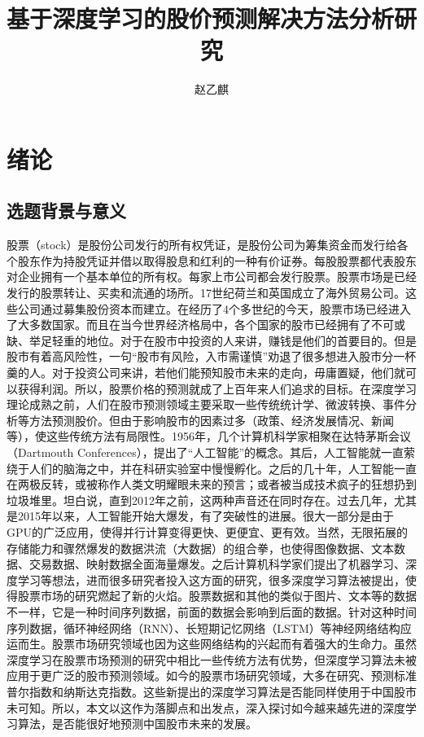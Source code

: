 \documentclass[UTF8]{ctexart}
\author{赵乙麒}
\title{基于深度学习的股价预测解决方法分析研究}
\begin{document}
\maketitle
\section{绪论}
\subsection{选题背景与意义}
股票（stock）是股份公司发行的所有权凭证，是股份公司为筹集资金而发行给各个股东作为持股凭证并借以取得股息和红利的一种有价证券。每股股票都代表股东对企业拥有一个基本单位的所有权。每家上市公司都会发行股票。股票市场是已经发行的股票转让、买卖和流通的场所。17世纪荷兰和英国成立了海外贸易公司。这些公司通过募集股份资本而建立。在经历了4个多世纪的今天，股票市场已经进入了大多数国家。而且在当今世界经济格局中，各个国家的股市已经拥有了不可或缺、举足轻重的地位。对于在股市中投资的人来讲，赚钱是他们的首要目的。但是股市有着高风险性，一句“股市有风险，入市需谨慎”劝退了很多想进入股市分一杯羹的人。对于投资公司来讲，若他们能预知股市未来的走向，毋庸置疑，他们就可以获得利润。所以，股票价格的预测就成了上百年来人们追求的目标。在深度学习理论成熟之前，人们在股市预测领域主要采取一些传统统计学、微波转换\cite{Ramsey1999}、事件分析\cite{Verma2017}等方法预测股价。但由于影响股市的因素过多（政策、经济发展情况、新闻等），使这些传统方法有局限性。1956年，几个计算机科学家相聚在达特茅斯会议（Dartmouth Conferences），提出了“人工智能”的概念。其后，人工智能就一直萦绕于人们的脑海之中，并在科研实验室中慢慢孵化。之后的几十年，人工智能一直在两极反转，或被称作人类文明耀眼未来的预言；或者被当成技术疯子的狂想扔到垃圾堆里。坦白说，直到2012年之前，这两种声音还在同时存在。过去几年，尤其是2015年以来，人工智能开始大爆发，有了突破性的进展\cite{LeCun2015,Schmidhuber2015}。很大一部分是由于GPU的广泛应用，使得并行计算变得更快、更便宜、更有效。当然，无限拓展的存储能力和骤然爆发的数据洪流（大数据）的组合拳，也使得图像数据、文本数据、交易数据、映射数据全面海量爆发。之后计算机科学家们提出了机器学习、深度学习等想法，进而很多研究者投入这方面的研究，很多深度学习算法被提出，使得股票市场的研究燃起了新的火焰。股票数据和其他的类似于图片、文本等的数据不一样，它是一种时间序列数据，前面的数据会影响到后面的数据。针对这种时间序列数据，循环神经网络（RNN）、长短期记忆网络（LSTM）等神经网络结构应运而生。股票市场研究领域也因为这些网络结构的兴起而有着强大的生命力。虽然深度学习在股票市场预测的研究中相比一些传统方法有优势，但深度学习算法未被应用于更广泛的股市预测领域。如今的股票市场研究领域，大多在研究、预测标准普尔指数和纳斯达克指数。这些新提出的深度学习算法是否能同样使用于中国股市未可知。所以，本文以这作为落脚点和出发点，深入探讨如今越来越先进的深度学习算法，是否能很好地预测中国股市未来的发展。
\end{document}
